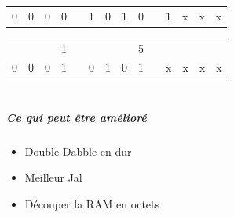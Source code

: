 \documentclass[table]{beamer}
\begin{document}
\begin{frame}
{\begin{center}
\begin{tabular}{|c|c|c|c|c|c|c|c|c|c|c|c|c|c|}
				\cline{1-4} \cline{6-9} \cline{11-14}
				0&0&0&0&&1&0&1&0&&1&\cellcolor{black!50}x&\cellcolor{black!50}x&\cellcolor{black!50}x\\
				\cline{1-4} \cline{6-9} \cline{11-14}
			\end{tabular}
		\end{center}}
		\only<6>
		{\begin{center}
			\def\arraystretch{1.5}
			\begin{tabular}{|c|c|c|c|c|c|c|c|c|c|c|c|c|c|}
				\multicolumn{3}{c}{}&\multicolumn{1}{c}{1}&\multicolumn{4}{c}{}&\multicolumn{1}{c}{5}&\multicolumn{4}{c}{}\\
				\cline{1-4} \cline{6-9} \cline{11-14}
				0&0&0&1&&0&1&0&1&&\cellcolor{black!50}x&\cellcolor{black!50}x&\cellcolor{black!50}x&\cellcolor{black!50}x\\
				\cline{1-4} \cline{6-9} \cline{11-14}
			\end{tabular}
		\end{center}}

	\end{frame}

	\part{}
	\begin{frame}[plain] %
		\frametitle{Ce qui peut être amélioré}
		\begin{itemize}
			\item Double-Dabble en dur
			\item Meilleur Jal
			\item Découper la RAM en octets
		\end{itemize}
	\end{frame}
		
\end{document}
